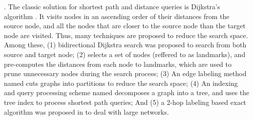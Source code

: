 .
The classic solution for shortest path and distance queries is Dijkstra's algorithm \cite{Dijkstra59}. It visits nodes in an ascending order of their distances from the source node, and all the nodes that are closer to the source node than the target node are visited. Thus, many techniques are proposed to reduce the search space. Among these, (1) bidirectional Dijkstra search \cite{LubyR89} was proposed to search from both source and target node; (2) \alt \cite{GoldbergH05} selects a set of nodes (reffered to as landmarks), and pre-computes the distances from each node to landmarks, which are used to prune unnecessary nodes during the search process; (3) An edge labeling method named \arcflag \cite{MohringSSWW05} cuts graphs into partitions to reduce the search space;
(4) An indexing and query processing scheme named \tedi \cite{Wei10} decomposes a graph into a tree, and uses the tree index to process shortest path queries; And (5) a 2-hop labeling based exact algorithm was proposed in \cite{delling2014robust} to deal with large networks.





